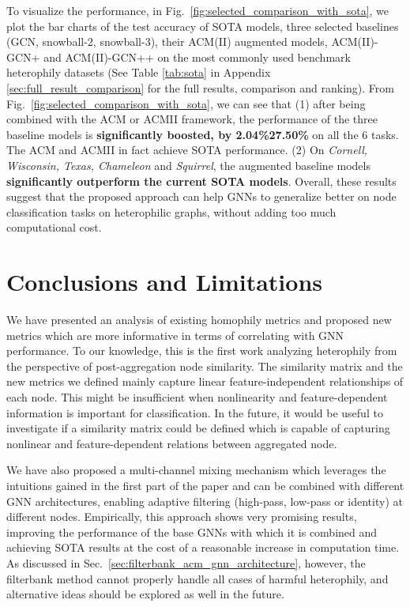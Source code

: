 \documentclass{article}
\newcommand{\0}{{\boldsymbol{0}}}
\newcommand{\6}{{\partial}}
\newcommand{\8}{{\infty}}
\newcommand{\4}{{\nabla}}
\begin{document}
To visualize the performance, in Fig.~\ref{fig:selected_comparison_with_sota}, we plot the bar charts of the test accuracy of SOTA models, three selected baselines (GCN, snowball-2, snowball-3), their ACM(II) augmented models, ACM(II)-GCN+ and ACM(II)-GCN++ on the  most commonly used benchmark heterophily datasets (See Table \ref{tab:sota} in Appendix \ref{sec:full_result_comparison} for the full results, comparison and ranking). From Fig.~\ref{fig:selected_comparison_with_sota}, we can see that (1) after being combined with the ACM or ACMII framework, the performance of the three baseline models is \textbf{significantly boosted, by 2.04\%27.50\%} on all the 6 tasks. The ACM and ACMII in fact achieve SOTA performance. (2) On \textit{Cornell, Wisconsin, Texas, Chameleon} and \textit{Squirrel}, the augmented baseline models \textbf{significantly outperform the current SOTA models}. Overall, these results suggest that the proposed approach can help GNNs to generalize better on node classification tasks on heterophilic graphs, without adding too much computational cost.
\vspace{-0.3cm}
\section{Conclusions and Limitations}
\vspace{-0.2cm}
We have presented an analysis of existing homophily metrics and proposed new metrics which are more informative in terms of correlating with GNN performance. 
 To our knowledge, this is the first work analyzing heterophily from the perspective of post-aggregation node similarity.
 The similarity matrix and the new metrics we defined  mainly capture linear feature-independent relationships of each node. This might be insufficient when nonlinearity and feature-dependent information is important for classification. In the future, it would be useful to investigate if a similarity matrix could be defined which is capable of capturing nonlinear and feature-dependent relations between aggregated node.



We have also proposed a multi-channel mixing mechanism which leverages the intuitions gained in the first part of the paper and can be combined with different GNN architectures, enabling adaptive filtering (high-pass, low-pass or identity) at different nodes. Empirically, this approach shows very promising results, improving the performance of the base GNNs with which it is combined and achieving SOTA results at the cost of a reasonable increase in computation time.
As discussed in Sec.~\ref{sec:filterbank_acm_gnn_architecture}, however, the filterbank method cannot properly handle all cases of harmful  heterophily, and alternative ideas should be explored as well in the future.
\end{document}
